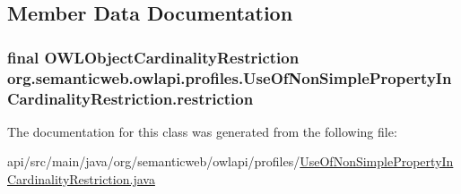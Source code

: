 \subsection{Member Data Documentation}
\hypertarget{classorg_1_1semanticweb_1_1owlapi_1_1profiles_1_1_use_of_non_simple_property_in_cardinality_restriction_a52424aeca4daf3a360ac1eb19450925f}{
\subsubsection[{restriction}]{\setlength{\rightskip}{0pt plus 5cm}final {\bf O\-W\-L\-Object\-Cardinality\-Restriction} org.\-semanticweb.\-owlapi.\-profiles.\-Use\-Of\-Non\-Simple\-Property\-In\-Cardinality\-Restriction.\-restriction\hspace{0.3cm}{\ttfamily [private]}}}\label{classorg_1_1semanticweb_1_1owlapi_1_1profiles_1_1_use_of_non_simple_property_in_cardinality_restriction_a52424aeca4daf3a360ac1eb19450925f}


The documentation for this class was generated from the following file\-:\begin{DoxyCompactItemize}
\item 
api/src/main/java/org/semanticweb/owlapi/profiles/\hyperlink{_use_of_non_simple_property_in_cardinality_restriction_8java}{Use\-Of\-Non\-Simple\-Property\-In\-Cardinality\-Restriction.\-java}\end{DoxyCompactItemize}
